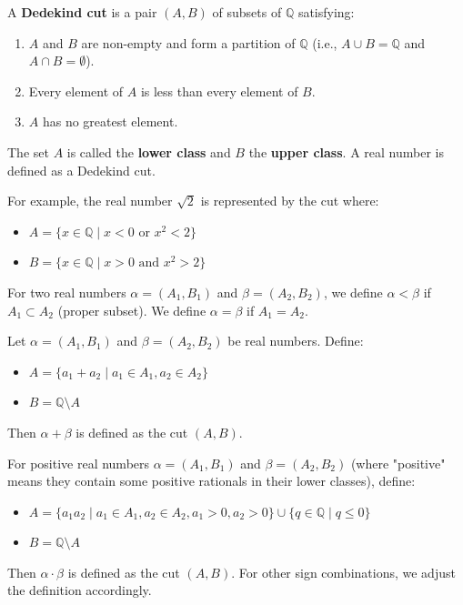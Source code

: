 \begin{definition}
A \textbf{Dedekind cut} is a pair $(A, B)$ of subsets of $\mathbb{Q}$ satisfying:
\begin{enumerate}
    \item $A$ and $B$ are non-empty and form a partition of $\mathbb{Q}$ (i.e., $A \cup B = \mathbb{Q}$ and $A \cap B = \emptyset$).
    \item Every element of $A$ is less than every element of $B$.
    \item $A$ has no greatest element.
\end{enumerate}
The set $A$ is called the \textbf{lower class} and $B$ the \textbf{upper class}. A real number is defined as a Dedekind cut.
\end{definition}

For example, the real number $\sqrt{2}$ is represented by the cut where:
\begin{itemize}
    \item $A = \{x \in \mathbb{Q} \mid x < 0 \text{ or } x^2 < 2\}$
    \item $B = \{x \in \mathbb{Q} \mid x > 0 \text{ and } x^2 > 2\}$
\end{itemize}

\begin{definition}
For two real numbers $\alpha = (A_1, B_1)$ and $\beta = (A_2, B_2)$, we define $\alpha < \beta$ if $A_1 \subset A_2$ (proper subset). We define $\alpha = \beta$ if $A_1 = A_2$.
\end{definition}

\begin{definition}
Let $\alpha = (A_1, B_1)$ and $\beta = (A_2, B_2)$ be real numbers. Define:
\begin{itemize}
    \item $A = \{a_1 + a_2 \mid a_1 \in A_1, a_2 \in A_2\}$
    \item $B = \mathbb{Q} \setminus A$
\end{itemize}
Then $\alpha + \beta$ is defined as the cut $(A, B)$.
\end{definition}

\begin{definition}
For positive real numbers $\alpha = (A_1, B_1)$ and $\beta = (A_2, B_2)$ (where "positive" means they contain some positive rationals in their lower classes), define:
\begin{itemize}
    \item $A = \{a_1a_2 \mid a_1 \in A_1, a_2 \in A_2, a_1 > 0, a_2 > 0\} \cup \{q \in \mathbb{Q} \mid q \le 0\}$
    \item $B = \mathbb{Q} \setminus A$
\end{itemize}
Then $\alpha \cdot \beta$ is defined as the cut $(A, B)$. For other sign combinations, we adjust the definition accordingly.
\end{definition}

